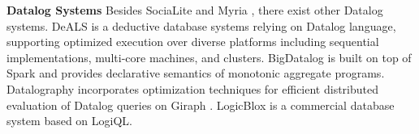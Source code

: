 \noindent\textbf{Datalog Systems}
Besides SociaLite \cite{Lam:2013:SDE:2510649.2511289,Seo:2013:DSD:2556549.2556572} and Myria \cite{Halperin:2014:DMB:2588555.2594530,Wang:2015:AFR:2824032.2824052}, there exist other Datalog systems. DeALS \cite{Shkapsky:2013:GQN:2536274.2536290,7113340} is a deductive database systems relying on Datalog language, supporting optimized execution over diverse platforms including sequential implementations, multi-core machines, and clusters. BigDatalog \cite{Shkapsky:2016:BDA:2882903.2915229} is built on top of Spark \cite{Zaharia:2010:SCC:1863103.1863113} and provides declarative semantics of monotonic aggregate programs. Datalography \cite{7840589} incorporates optimization techniques for efficient distributed evaluation of Datalog queries on Giraph \cite{giraph}. LogicBlox \cite{Aref:2015:DIL:2723372.2742796} is a commercial database system based on LogiQL.

